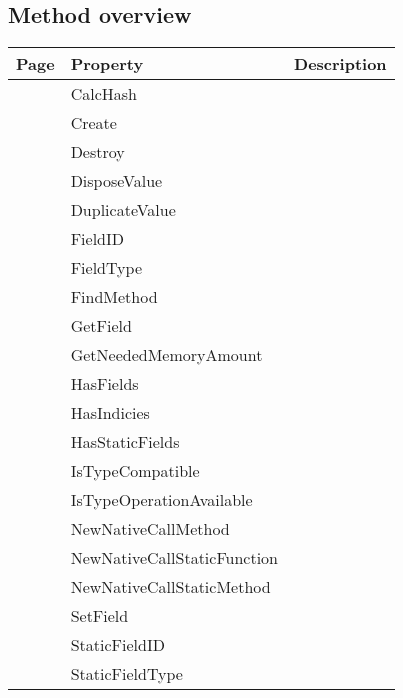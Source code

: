 \subsection{Method overview}
\label{thoriumcore:thorium:tthoriumrttiobjecttype:methods}
\begin{tabularx}{\textwidth}{llX}
Page & Property & Description  \\ \hline
\pageref{thoriumcore:thorium:tthoriumrttiobjecttype:calchash} & CalcHash  &  \\
\pageref{thoriumcore:thorium:tthoriumrttiobjecttype:create} & Create  &  \\
\pageref{thoriumcore:thorium:tthoriumrttiobjecttype:destroy} & Destroy  &  \\
\pageref{thoriumcore:thorium:tthoriumrttiobjecttype:disposevalue} & DisposeValue  &  \\
\pageref{thoriumcore:thorium:tthoriumrttiobjecttype:duplicatevalue} & DuplicateValue  &  \\
\pageref{thoriumcore:thorium:tthoriumrttiobjecttype:fieldid} & FieldID  &  \\
\pageref{thoriumcore:thorium:tthoriumrttiobjecttype:fieldtype} & FieldType  &  \\
\pageref{thoriumcore:thorium:tthoriumrttiobjecttype:findmethod} & FindMethod  &  \\
\pageref{thoriumcore:thorium:tthoriumrttiobjecttype:getfield} & GetField  &  \\
\pageref{thoriumcore:thorium:tthoriumrttiobjecttype:getneededmemoryamount} & GetNeededMemoryAmount  &  \\
\pageref{thoriumcore:thorium:tthoriumrttiobjecttype:hasfields} & HasFields  &  \\
\pageref{thoriumcore:thorium:tthoriumrttiobjecttype:hasindicies} & HasIndicies  &  \\
\pageref{thoriumcore:thorium:tthoriumrttiobjecttype:hasstaticfields} & HasStaticFields  &  \\
\pageref{thoriumcore:thorium:tthoriumrttiobjecttype:istypecompatible} & IsTypeCompatible  &  \\
\pageref{thoriumcore:thorium:tthoriumrttiobjecttype:istypeoperationavailable} & IsTypeOperationAvailable  &  \\
\pageref{thoriumcore:thorium:tthoriumrttiobjecttype:newnativecallmethod} & NewNativeCallMethod  &  \\
\pageref{thoriumcore:thorium:tthoriumrttiobjecttype:newnativecallstaticfunction} & NewNativeCallStaticFunction  &  \\
\pageref{thoriumcore:thorium:tthoriumrttiobjecttype:newnativecallstaticmethod} & NewNativeCallStaticMethod  &  \\
\pageref{thoriumcore:thorium:tthoriumrttiobjecttype:setfield} & SetField  &  \\
\pageref{thoriumcore:thorium:tthoriumrttiobjecttype:staticfieldid} & StaticFieldID  &  \\
\pageref{thoriumcore:thorium:tthoriumrttiobjecttype:staticfieldtype} & StaticFieldType  &  \\
\hline
\end{tabularx}
